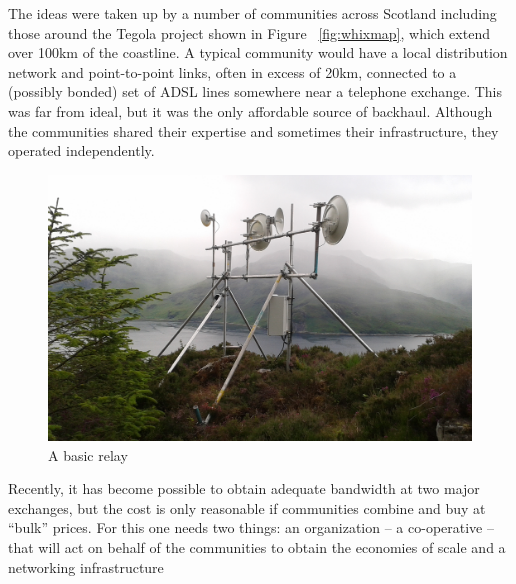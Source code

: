  The ideas were taken up by a number of communities across Scotland including those around the Tegola project shown in Figure ~\ref{fig:whixmap}, which extend over 100km of the coastline. A typical community would have a local distribution network and point-to-point links, often in excess of 20km, connected to a (possibly bonded) set of ADSL lines somewhere near a telephone exchange. This was far from ideal, but it was the only affordable source of backhaul. Although the communities shared their expertise and sometimes their infrastructure, they operated independently.
\begin{figure}[h]
\centering
 \includegraphics[width=\columnwidth]{figs/mhialairigh-from-behind}
 \caption{A basic relay}
\label{fig:mhialairigh}
\end{figure}

Recently, it has become possible to obtain adequate bandwidth at two major exchanges, but the cost is only reasonable if communities combine and buy at ``bulk'' prices.  For this one needs two things: an organization -- a co-operative -- that will act on behalf of the communities to obtain the economies of scale and a networking infrastructure

